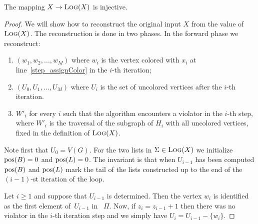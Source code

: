 \begin{klaim}
The mapping $X \to \text{\scshape Log}(X)$ is injective.
\end{klaim}

\begin{proof}
  We will show how to reconstruct the original input $X$
  from the value of $\text{\scshape Log}(X)$.
  The reconstruction is done in two
  phases. In the forward phase we reconstruct:
  \begin{enumerate}[label=\textup{(\roman*)},nosep]
  \item $(w_1,w_2,\ldots,w_M)$ where $w_i$ is the vertex colored with $x_i$
  at line~\ref{step_assignColor} in the $i$-th iteration;
  \item $(U_0,U_1,\ldots,U_M)$ where $U_i$ is the set of uncolored vertices 
  after the $i$-th iteration.
  \item $W'_i$ for every $i$ such that the algorithm encounters a violator in the $i$-th step, 
  where $W'_i$ is the traversal of the subgraph of $H_i$ with all uncolored vertices, 
  fixed in the definition of $\text{\scshape Log}(X)$.
  \end{enumerate} 
  Note first that $U_0=V(G)$.
  For the two lists in
  $\Sigma \in \text{\scshape Log}(X)$ we initialize $\text{\rmfamily pos}(B)=0$ and $\text{\rmfamily pos}(L)=0$.
  The invariant is that when $U_{i-1}$ has been computed $\text{\rmfamily pos}(B)$ and
  $\text{\rmfamily pos}(L)$ mark the tail of the lists constructed up to the end of 
  the $(i-1)$-st iteration of the loop.

  Let $i\geq1$ and suppose that $U_{i-1}$ is determined.
  Then the vertex $w_i$ is identified as the 
  first element of~$U_{i-1}$ in ~$\Pi$.
  Now, if $z_{i} = z_{i-1} +1$ then 
  there was no violator in the $i$-th iteration step and we simply have 
  $U_i = U_{i-1} - \{w_i\}$.
  

\end{proof}
